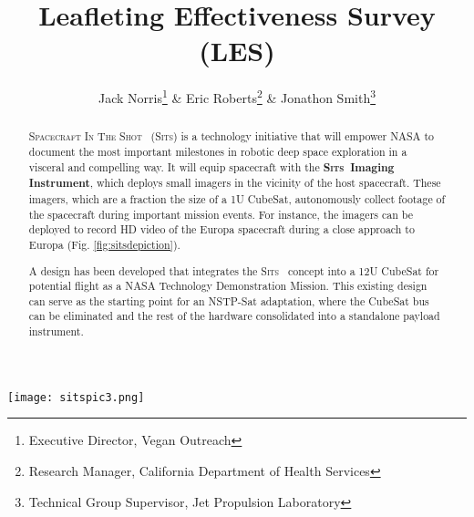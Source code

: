 \documentclass{tufte-handout}
\title{Leafleting Effectiveness Survey (LES)}
\author[Jack Norris \& Eric Roberts \& Jonathon Smith]{Jack Norris\thanks{Executive Director, Vegan Outreach} \& Eric Roberts\thanks{Research Manager, California Department of Health Services} \& Jonathon Smith\thanks{Technical Group Supervisor, Jet Propulsion Laboratory}}
\newcommand{\sitslong}[0]{\textsc{Spacecraft In The Shot}}%
\newcommand{\sitsshort}[0]{\textsc{Sits}}%
\begin{document}
\maketitle%


\begin{abstract}
\noindent
\sitslong~ (\sitsshort) is a technology initiative that will empower NASA to 
document the most important milestones in robotic deep space exploration 
in a visceral and compelling way. It will equip spacecraft with the 
\textbf{\sitsshort~Imaging Instrument}, which deploys small imagers 
in the vicinity of the host spacecraft. These imagers, which are a 
fraction the size of a 1U CubeSat, autonomously collect footage of the 
spacecraft during important mission events. For instance, 
the imagers can be deployed to record HD video of the Europa 
spacecraft during a close approach to Europa 
(Fig. \ref{fig:sitsdepiction}). 

A design has been developed that integrates the \sitsshort~ concept 
into a 12U CubeSat for potential flight as a NASA Technology Demonstration 
Mission. This existing design can serve as the starting point for an 
NSTP-Sat adaptation, where the CubeSat bus can be eliminated and the 
rest of the hardware consolidated into a standalone payload instrument. 
\end{abstract}

\begin{marginfigure}[-2 in]%
  \texttt{[image: sitspic3.png]}
  \caption{Illustration of \sitsshort~ footage of Europa spacecraft
  during Europa close approach.}
  \label{fig:sitsdepiction}
\end{marginfigure}

  
\end{document}
